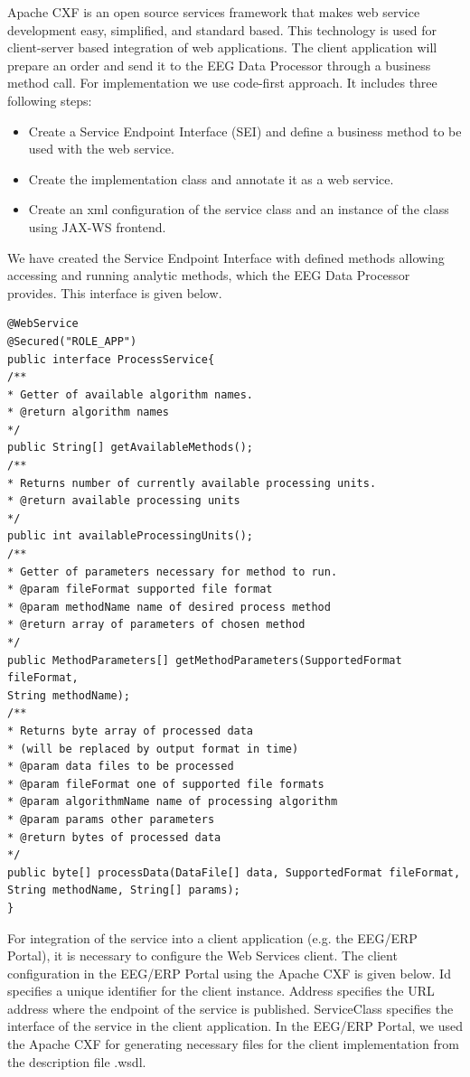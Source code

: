 \documentclass{frontiersSCNS} %
\begin{document}
Apache CXF \cite{CXF} is an open source services framework that makes web service development easy, simplified, and standard based. This technology is used for client-server based integration of web applications. The client application will prepare an order and send it to the EEG Data Processor through a business method call. For implementation we use code-first approach. It includes three following steps:

\begin{itemize}
\item Create a Service Endpoint Interface (SEI) and define a business method to be used with the web service.
\item Create the implementation class and annotate it as a web service.
\item Create an xml configuration of the service class and an instance of the class using JAX-WS frontend.

\end{itemize}

We have created the Service Endpoint Interface with defined methods allowing accessing and running analytic methods, which the EEG Data Processor provides. This interface is given below.

\begin{small}
\begin{verbatim}
@WebService
@Secured("ROLE_APP")
public interface ProcessService{
/**
* Getter of available algorithm names.
* @return algorithm names
*/
public String[] getAvailableMethods();
/**
* Returns number of currently available processing units.
* @return available processing units
*/
public int availableProcessingUnits();
/**
* Getter of parameters necessary for method to run.
* @param fileFormat supported file format
* @param methodName name of desired process method
* @return array of parameters of chosen method
*/
public MethodParameters[] getMethodParameters(SupportedFormat fileFormat,
String methodName);
/**
* Returns byte array of processed data
* (will be replaced by output format in time)
* @param data files to be processed
* @param fileFormat one of supported file formats
* @param algorithmName name of processing algorithm
* @param params other parameters
* @return bytes of processed data
*/
public byte[] processData(DataFile[] data, SupportedFormat fileFormat,
String methodName, String[] params);
}
\end{verbatim}
\end{small}

For integration of the service into a client application (e.g. the EEG/ERP Portal), it is necessary to configure the Web Services client. The client configuration in the EEG/ERP Portal using the Apache CXF is given below. Id specifies a unique identifier for the client instance. Address specifies the URL address where the endpoint of the service is published. ServiceClass specifies the interface of the service in the client application. In the EEG/ERP Portal, we used the Apache CXF for generating necessary files for the client implementation from the description file .wsdl.
\end{document}
